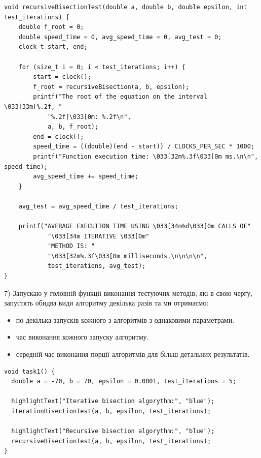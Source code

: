 \begin{lstlisting}[style=customc]
void recursiveBisectionTest(double a, double b, double epsilon, int test_iterations) {
    double f_root = 0;
    double speed_time = 0, avg_speed_time = 0, avg_test = 0;
    clock_t start, end;

    for (size_t i = 0; i < test_iterations; i++) {
        start = clock();
        f_root = recursiveBisection(a, b, epsilon);
        printf("The root of the equation on the interval \033[33m[%.2f, "
            "%.2f]\033[0m: %.2f\n",
            a, b, f_root);
        end = clock();
        speed_time = ((double)(end - start)) / CLOCKS_PER_SEC * 1000;
        printf("Function execution time: \033[32m%.3f\033[0m ms.\n\n", speed_time);
        avg_speed_time += speed_time;
    }

    avg_test = avg_speed_time / test_iterations;

    printf("AVERAGE EXECUTION TIME USING \033[34m%d\033[0m CALLS OF"
            "\033[34m ITERATIVE \033[0m"
            "METHOD IS: "
            "\033[32m%.3f\033[0m milliseconds.\n\n\n\n",
            test_iterations, avg_test);
}
\end{lstlisting}

7) Запускаю у головній функції виконання тестуючих методів, які в свою чергу, запустять обидва види алгоритму декілька разів та ми отримаємо:
\begin{itemize}
    \item по декілька запусків кожного з алгоритмів з однаковими параметрами.
    \item час виконання кожного запуску алгоритму.
    \item середній час виконання порції алгоритмів для більш детальних результатів.
\end{itemize} 

\begin{lstlisting}[style=customc]
void task1() {
  double a = -70, b = 70, epsilon = 0.0001, test_iterations = 5;

  highlightText("Iterative bisection algorythm:", "blue");
  iterationBisectionTest(a, b, epsilon, test_iterations);

  highlightText("Recursive bisection algorythm:", "blue");
  recursiveBisectionTest(a, b, epsilon, test_iterations);
}
\end{lstlisting}

